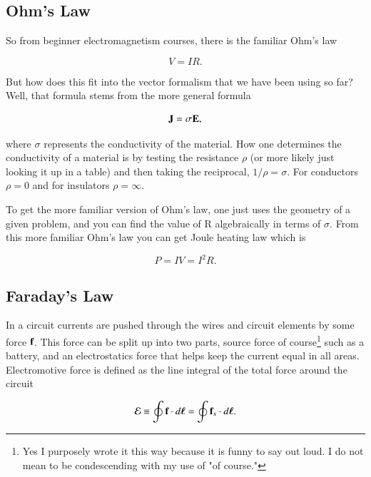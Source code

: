 \documentclass[preprint, review,12pt]{elsarticle}
\def\.{\cdot}
\def\b{\textbf}
\def\bell{\bm{\ell}}
\def\={\equiv}
\def\emf{\mathcal{E}}
\begin{document}
\subsection{Ohm's Law}

So from beginner electromagnetism courses, there is the familiar Ohm's law

\begin{equation}
    V = IR.
\end{equation}

But how does this fit into the vector formalism that we have been using so far? Well, that formula stems from the more general formula

\begin{equation}
    \b J = \sigma \b E,
\end{equation}

where $\sigma$ represents the conductivity of the material. How one determines the conductivity of a material is by testing the resistance $\rho$ (or more likely just looking it up in a table) and then taking the reciprocal, $1/\rho = \sigma$. For conductors $\rho = 0$ and for insulators $\rho = \infty$.

To get the more familiar version of Ohm's law, one just uses the geometry of a given problem, and you can find the value of R algebraically in terms of $\sigma$. From this more familiar Ohm's law you can get Joule heating law which is

\begin{equation}
    P = IV = I^2R.
\end{equation}

\subsection{Faraday's Law}

In a circuit currents are pushed through the wires and circuit elements by some force $\b f$. This force can be split up into two parts, source force of course\footnote{Yes I purposely wrote it this way because it is funny to say out loud. I do not mean to be condescending with my use of "of course."} such as a battery, and an electrostatics force that helps keep the current equal in all areas. Electromotive force is defined as the line integral of the total force around the circuit

\begin{equation}
    \emf \= \oint \b f \. d\bell = \oint \b f_s \. d\bell.
\end{equation}
\end{document}
